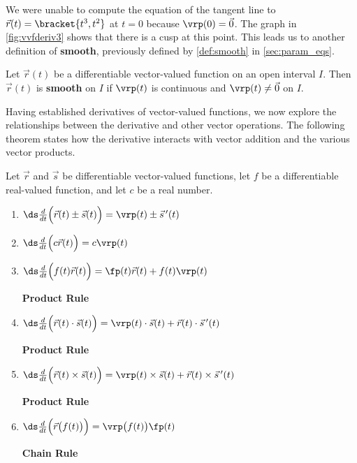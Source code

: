 We were unable to compute the equation of the tangent line to $\vec r(t)=\bracket{t^3,t^2}$ at $t=0$ because $\vrp(0) = \vec 0$. The graph in \autoref{fig:vvfderiv3} shows that there is a cusp at this point. This leads us to another definition of \textbf{smooth}, previously defined by \autoref{def:smooth} in \autoref{sec:param_eqs}.

\begin{definition}\label{def:vector_smooth}
Let $\vec r(t)$ be a differentiable vector-valued function on an open interval $I$. Then $\vec r(t)$ is \textbf{smooth} on $I$ if $\vrp(t)$ is continuous and $\vrp(t)\neq \vec 0$ on $I$.
\end{definition}

Having established derivatives of vector-valued functions, we now explore the relationships between the derivative and other vector operations. The following theorem states how the derivative interacts with vector addition and the various vector products.


\begin{theorem}\label{thm:vvf_deriv_prop}
Let $\vec r$ and $\vec s$ be differentiable vector-valued functions, let $f$ be a differentiable real-valued function, and let $c$ be a real number.
\begin{enumerate}
	\item $\ds \frac{d}{dt}\Big(\vec r(t) \pm \vec s(t)\Big) = \vrp(t) \pm \vec s\,'(t)$
	\item $\ds \frac{d}{dt}\Big(c\vec r(t)\Big) = c\vrp(t)$
	\item \parbox{200pt}{$\ds \frac{d}{dt}\Big(f(t)\vec r(t)\Big) = \fp(t)\vec r(t) + f(t)\vrp(t)$} \textbf{Product Rule}
	\item \parbox{200pt}{$\ds \frac{d}{dt}\Big(\vec r(t)\cdot \vec s(t) \Big) = \vrp(t)\cdot \vec s(t) + \vec r(t)\cdot \vec s\,'(t)$} \textbf{Product Rule}
	\item\label{crossprodrule} \parbox{200pt}{$\ds \frac{d}{dt}\Big(\vec r(t)\times \vec s(t) \Big) = \vrp(t)\times \vec s(t) + \vec r(t)\times \vec s\,'(t)$} \textbf{Product Rule}
	\item \parbox{200pt}{$\ds \frac{d}{dt}\Big(\vec r\big(f(t)\big)\Big) = \vrp\big(f(t)\big)\fp(t)$}  \textbf{Chain Rule}
\end{enumerate}
\end{theorem}

